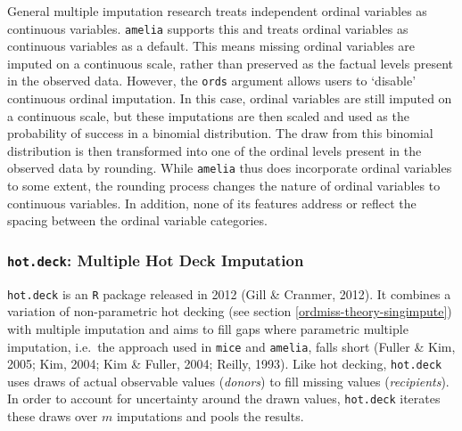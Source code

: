 \documentclass[12pt,econ]{sources/authesis}
\begin{document}
General multiple imputation research treats independent ordinal variables as continuous variables. \texttt{amelia} supports this and treats ordinal variables as continuous variables as a default. This means missing ordinal variables are imputed on a continuous scale, rather than preserved as the factual levels present in the observed data. However, the \texttt{ords} argument allows users to `disable' continuous ordinal imputation. In this case, ordinal variables are still imputed on a continuous scale, but these imputations are then scaled and used as the probability of success in a binomial distribution. The draw from this binomial distribution is then transformed into one of the ordinal levels present in the observed data by rounding. While \texttt{amelia} thus does incorporate ordinal variables to some extent, the rounding process changes the nature of ordinal variables to continuous variables. In addition, none of its features address or reflect the spacing between the ordinal variable categories.

\hypertarget{ordmiss-theory-multimpute-hdnorm}{%
\subsubsection{\texorpdfstring{\texttt{hot.deck}: Multiple Hot Deck Imputation}{hot.deck: Multiple Hot Deck Imputation}}\label{ordmiss-theory-multimpute-hdnorm}}

\texttt{hot.deck} is an \texttt{R} package released in 2012 (Gill \& Cranmer, 2012). It combines a variation of non-parametric hot decking (see section \ref{ordmiss-theory-singimpute}) with multiple imputation and aims to fill gaps where parametric multiple imputation, i.e.~the approach used in \texttt{mice} and \texttt{amelia}, falls short (Fuller \& Kim, 2005; Kim, 2004; Kim \& Fuller, 2004; Reilly, 1993). Like hot decking, \texttt{hot.deck} uses draws of actual observable values (\textit{donors}) to fill missing values (\textit{recipients}). In order to account for uncertainty around the drawn values, \texttt{hot.deck} iterates these draws over \(m\) imputations and pools the results.
\end{document}
